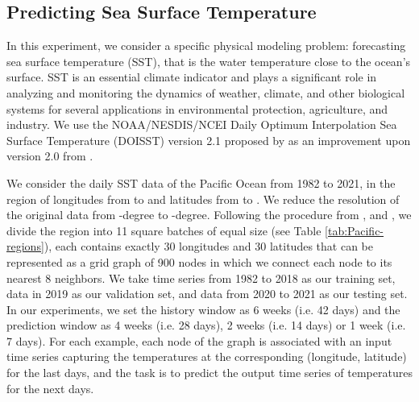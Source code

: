 \documentclass[nohyperref]{article}
\theoremstyle{plain}
\theoremstyle{definition}
\theoremstyle{remark}
\begin{document}
\subsection{Predicting Sea Surface Temperature} \label{appendix:climate}
\label{appendix:climate}
In this experiment, we consider a specific physical modeling problem: forecasting sea surface temperature (SST), that is the water temperature close to the ocean's surface. SST is an essential climate indicator and plays a significant role in analyzing and monitoring the dynamics of weather, climate, and other biological systems for several applications in environmental protection, agriculture, and industry. We use the NOAA/NESDIS/NCEI Daily Optimum Interpolation Sea Surface Temperature (DOISST) version 2.1 proposed by \cite{ImprovementsoftheDailyOptimumInterpolationSeaSurfaceTemperatureDOISSTVersion21} as an improvement upon version 2.0 from \cite{Reynolds:2007}. 


We consider the daily SST data of the Pacific Ocean from 1982 to 2021, in the region of longitudes from  to  and latitudes from  
to . We reduce the resolution of the original data from -degree 
to -degree. 
Following the procedure from \cite{de2018deep}, \cite{deBezenac2019} and \cite{wang2022metalearning}, we divide the region into 11 square batches of equal size (see Table \ref{tab:Pacific-regions}), each contains exactly 30 longitudes and 30 latitudes that can be represented as a grid graph of 900 nodes in which we connect each node to its nearest 8 neighbors. We take time series from 1982 to 2018 as our training set, data in 2019 as our validation set, and data from 2020 to 2021 as our testing set. 
In our experiments, we set the history window  as 6 weeks (i.e. 42 days) and the prediction window  as 4 weeks (i.e. 28 days), 2 weeks (i.e. 14 days) or 1 week (i.e. 7 days). For each example, each node of the graph is associated with an input time series capturing the temperatures at the corresponding (longitude, latitude) for the last  days, and the task is to predict the output time series of temperatures for the next  days. 
\end{document}
